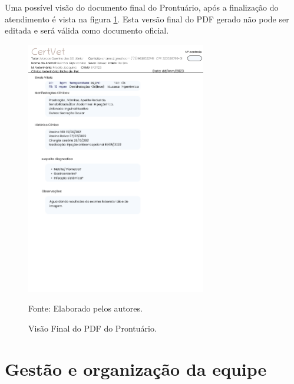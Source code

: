 \documentclass[
    12pt,               %
    openright,          %
    oneside,
    a4paper,            %
    BIBLATEX,           %
    TODO,               %
    english,            %
    brazil              %
    ]{ifsp-spo-inf-ctds}
\begin{document}
Uma possível visão do documento final do Prontuário, após a finalização do atendimento é vista na figura \ref{fig:PdfProntuario}. Esta versão final do PDF gerado não pode ser editada e será válida como documento oficial.

    \begin{figure}[H]
                \centering
                \caption{Visão Final do PDF do Prontuário.}
                \includegraphics[width=0.7\textwidth]{images/Telas/PDF do Prontuario.png}
                
                \label{fig:PdfProntuario}
                \centering
        {\footnotesize Fonte: Elaborado pelos autores.}
            \end{figure}    

        











            
    
    

    \section{Gestão e organização da equipe}
\end{document}
